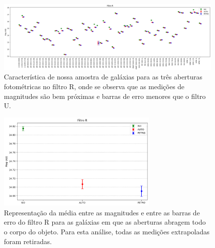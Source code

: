 \begin{figure}
  \centering 
  \includegraphics[width=1.0\textwidth]{Imagens/galaxias_horizontal_r.png} 
  \caption[Nossa amostra vista no filtro R para as três aberturas fotométricas.]{Característica de nossa amostra de galáxias para as três aberturas fotométricas no filtro R, onde se observa que as medições de magnitudes são bem próximas e barras de erro menores que o filtro U.}
  \label{fig:r_galaxias_horizontal_r} 
\end{figure}

\begin{figure}
  \centering 
  \includegraphics[width=0.7\textwidth]{Imagens/incerteza_abertura_r.png} 
  \caption[Média entre as três aberturas e seus respectivos erros para o filtro R.]{Representação da média entre as magnitudes e entre as barras de erro do filtro R para as galáxias em que as aberturas abragem todo o corpo do objeto. Para esta análise, todas as medições extrapoladas foram retiradas.}
  \label{fig:r_incerteza_abertura_r} 
\end{figure}

